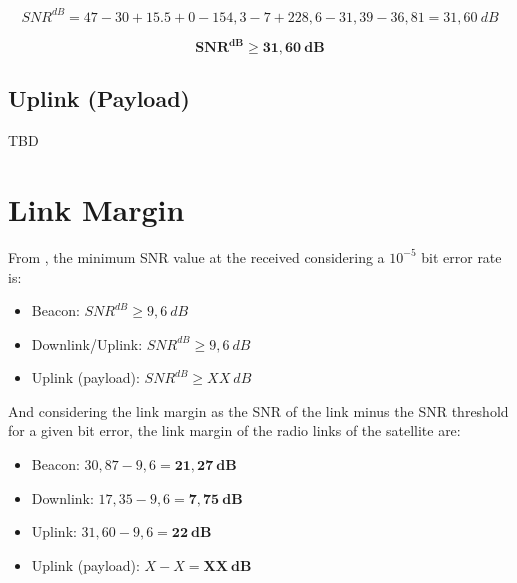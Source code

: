 \begin{equation}
    SNR^{dB} = 47 - 30 + 15.5 + 0 - 154,3 - 7 + 228,6 - 31,39 - 36,81 = 31,60\ dB
\end{equation}

\begin{equation}
    \mathbf{SNR^{dB} \geq 31,60\ dB}
\end{equation}

\subsection{Uplink (Payload)}

TBD

\section{Link Margin}

From \cite{larson2005}, the minimum SNR value at the received considering a $10^{-5}$ bit error rate is:

\begin{itemize}
    \item Beacon: $SNR^{dB} \geq 9,6\ dB$
    \item Downlink/Uplink: $SNR^{dB} \geq 9,6\ dB$
    \item Uplink (payload): $SNR^{dB} \geq XX\ dB$
\end{itemize}

And considering the link margin as the SNR of the link minus the SNR threshold for a given bit error, the link margin of the radio links of the satellite are:

\begin{itemize}
    \item Beacon: $30,87 - 9,6 = \mathbf{21,27\ dB}$
    \item Downlink: $17,35 - 9,6 = \mathbf{7,75\ dB}$
    \item Uplink: $31,60 - 9,6 = \mathbf{22\ dB}$
    \item Uplink (payload): $X - X = \mathbf{XX\ dB}$
\end{itemize}
